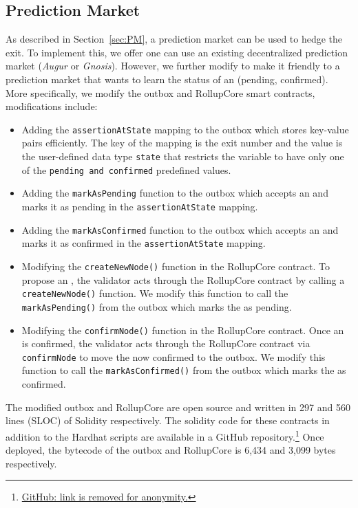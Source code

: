 \subsection{Prediction Market}
As described in Section~\ref{sec:PM}, a prediction market can be used to hedge the exit. To implement this, we offer one can use an existing decentralized prediction market (\eg \textit{Augur} or \textit{Gnosis}). However, we further modify \arb \nitro to make it friendly to a prediction market that wants to learn the status of an \rblock (pending, confirmed). More specifically, we modify the \arb \nitro outbox and RollupCore smart contracts, modifications include:

\begin{itemize}
\item Adding the \texttt{assertionAtState} mapping to the outbox which stores key-value pairs efficiently. The key of the mapping is the exit number and the value is the user-defined data type \texttt{state} that restricts the variable to have only one of the \texttt{pending and confirmed} predefined values.
\item Adding the \texttt{markAsPending} function to the outbox which accepts an \rblock and marks it as pending in the \texttt{assertionAtState} mapping.
\item Adding the \texttt{markAsConfirmed} function to the outbox which accepts an \rblock and marks it as confirmed in the \texttt{assertionAtState} mapping.
\item Modifying the \texttt{createNewNode()} function in the RollupCore contract. To propose an \rblock, the validator acts through the RollupCore contract by calling a \texttt{createNewNode()} function. We modify this function to call the \texttt{markAsPending()} from the outbox which marks the \rblock as pending.
\item Modifying the \texttt{confirmNode()} function in the RollupCore contract. Once an \rblock is confirmed, the validator acts through the RollupCore contract via \texttt{confirmNode} to move the now confirmed \rblock to the outbox. We modify this function to call the \texttt{markAsConfirmed()} from the outbox which marks the \rblock as confirmed.
\end{itemize}

The modified outbox and RollupCore are open source and written in 297 and 560  lines (SLOC) of Solidity respectively. The solidity code for these contracts in addition to the Hardhat scripts are available in a GitHub repository.\footnote{\href{https://}{GitHub: link is removed for anonymity.}} Once deployed, the bytecode of the outbox and RollupCore is 6,434 and 3,099 bytes respectively.




